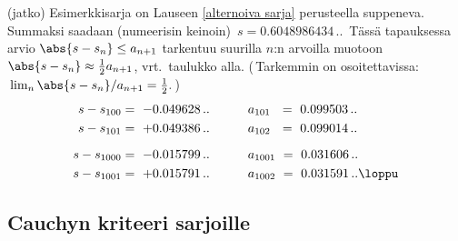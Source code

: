 \jatko \begin{Exa} (jatko) Esimerkkisarja on Lauseen \ref{alternoiva sarja} perusteella
suppeneva. Summaksi saadaan (numeerisin keinoin) $\,s=0.6048986434\,..\,$ Tässä
tapauksessa arvio $\abs{s-s_n} \le a_{n+1}$ tarkentuu suurilla $n$:n arvoilla muotoon
$\abs{s-s_n} \approx \tfrac{1}{2}a_{n+1}$, vrt.\ taulukko alla. (\,Tarkemmin on
osoitettavissa: $\,\lim_n\abs{s-s_n}/a_{n+1}=\tfrac{1}{2}.\,$)
\begin{align*}
s - s_{100}        &=\ -0.049628\,.. \qquad\quad a_{101}\ \ =\ 0.099503\,.. \\
s - s_{101}        &=\ +0.049386\,.. \qquad\quad a_{102}\ \ =\ 0.099014\,.. \\[2mm]
s - s_{1000}       &=\ -0.015799\,.. \qquad\quad a_{1001}\  =\ 0.031606\,.. \\
s - s_{1001}       &=\ +0.015791\,.. \qquad\quad a_{1002}\  =\ 0.031591\,.. \loppu
\end{align*}
\end{Exa}

\subsection{Cauchyn kriteeri sarjoille}


